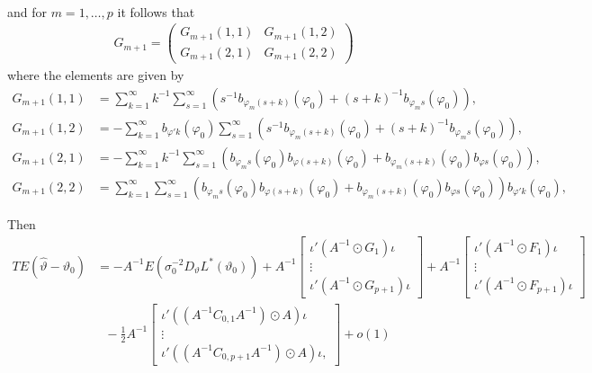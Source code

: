 {{\begin{align*}
\end{align*}
and for $m = 1,\dots, p$ it follows that 
\begin{align}
    G_{m+1} = \begin{pmatrix}
 G_{m+1}(1,1)  & G_{m+1}(1,2) \\
G_{m+1}(2,1) & G_{m+1}(2,2)
\end{pmatrix}  \label{genG2}
\end{align}
where the elements are given by
\begin{align*}
 G_{m+1}(1,1) &= \sum_{k = 1}^{\infty} k^{-1} \sum_{s = 1}^{\infty} \left(  s^{-1} b_{\varphi_m (s+k)}(\varphi_0) + (s+k)^{-1} b_{\varphi_m s}(\varphi_0) \right), \\
 G_{m+1}(1,2) &= -\sum_{k = 1}^{\infty} b_{\varphi' k}(\varphi_0)  \sum_{s = 1}^{\infty} \left(  s^{-1} b_{\varphi_m (s+k)}(\varphi_0) + (s+k)^{-1} b_{\varphi_m s}(\varphi_0) \right), \\
 G_{m+1}(2,1) &=  -\sum_{k = 1}^{\infty} k^{-1} \sum_{s = 1}^{\infty} \left(  b_{\varphi_m s}(\varphi_0) b_{\varphi (s+k)}(\varphi_0) + b_{\varphi_m (s+k)}(\varphi_0) b_{\varphi s}(\varphi_0) \right), \\
 G_{m+1}(2,2) &= \sum_{k = 1}^{\infty}  \sum_{s = 1}^{\infty} \left(  b_{\varphi_m s}(\varphi_0) b_{\varphi (s+k)}(\varphi_0) + b_{\varphi_m (s+k)}(\varphi_0) b_{\varphi s}(\varphi_0) \right)  b_{\varphi' k}(\varphi_0),
\end{align*}

Then
\begin{align*}
    T E(\hat{\vartheta}-\vartheta_0) &= -A^{-1} E(\sigma^{-2}_0 D_{\vartheta} L^*(\vartheta_0) ) + A^{-1}   \begin{bmatrix}
\iota' \left( A^{-1} \odot G_1 \right)\iota \\
\vdots    \\
\iota' \left( A^{-1} \odot G_{p+1} \right)\iota 
\end{bmatrix}
+  A^{-1}   \begin{bmatrix}
\iota' \left( A^{-1} \odot F_1 \right)\iota \\
\vdots    \\
\iota' \left( A^{-1} \odot F_{p+1} \right)\iota 
\end{bmatrix} \\
&\ \ \ - \frac{1}{2} A^{-1} \begin{bmatrix}
\iota' \left(\left(A^{-1} C_{0,1} A^{-1} \right) \odot A \right) \iota \\
\vdots  \\
\iota' \left(\left(A^{-1} C_{0,p+1} A^{-1} \right) \odot A \right) \iota,
\end{bmatrix} +  o(1)
\end{align*}

}}
